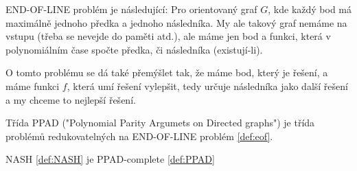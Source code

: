 \begin{definition}
\label{def:eof}
END-OF-LINE problém je následující: Pro orientovaný graf $G$, kde každý bod má maximálně jednoho předka a jednoho následníka. 
My ale takový graf nemáme na vstupu (třeba se nevejde do paměti atd.), ale máme jen bod a funkci, která v polynomiálním čase spočte předka, či následníka (existují-li). 

O tomto problému se dá také přemýšlet tak, že máme bod, který je řešení, a máme funkci $f$, která umí řešení vylepšit, tedy určuje následníka jako další řešení a my chceme to nejlepší řešení. 
\end{definition}
\begin{definition}
\label{def:PPAD}
Třída PPAD ("Polynomial Parity Argumets on Directed graphs") je třída problémů redukovatelných na END-OF-LINE problém \ref{def:eof}. 
\end{definition}

\begin{theorem}
\label{thm:nash_ppad}
NASH \ref{def:NASH} je PPAD-complete \ref{def:PPAD}
\end{theorem}
